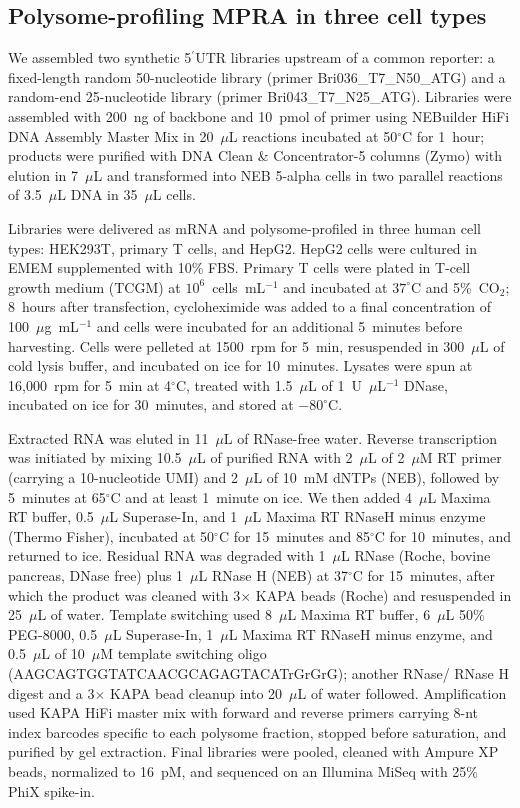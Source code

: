 \documentclass[11pt]{article}
\begin{document}
\subsection{Polysome-profiling MPRA in three cell types}

We assembled two synthetic 5$^\prime$UTR libraries upstream of a common
reporter: a fixed-length random 50-nucleotide library
(primer Bri036\_T7\_N50\_ATG) and a random-end 25-nucleotide library
(primer Bri043\_T7\_N25\_ATG). Libraries were assembled with 200~ng of
backbone and 10~pmol of primer using NEBuilder HiFi DNA Assembly
Master Mix in 20~$\mu$L reactions incubated at 50$^\circ$C for 1~hour;
products were purified with DNA Clean \& Concentrator-5 columns (Zymo)
with elution in 7~$\mu$L and transformed into NEB 5-alpha cells in two
parallel reactions of 3.5~$\mu$L DNA in 35~$\mu$L cells.

Libraries were delivered as mRNA and polysome-profiled in three human cell
types: HEK293T, primary T cells, and HepG2. HepG2 cells were cultured in
EMEM supplemented with 10\% FBS. Primary T cells were plated in T-cell
growth medium (TCGM) at $10^{6}$~cells~mL$^{-1}$ and incubated at
$37^\circ$C and 5\%~CO$_2$; 8~hours after transfection, cycloheximide was
added to a final concentration of 100~$\mu$g~mL$^{-1}$ and cells were
incubated for an additional 5~minutes before harvesting. Cells were
pelleted at 1500~rpm for 5~min, resuspended in 300~$\mu$L of cold lysis
buffer, and incubated on ice for 10~minutes. Lysates were spun at
16{,}000~rpm for 5~min at 4$^\circ$C, treated with 1.5~$\mu$L of
1~U~$\mu$L$^{-1}$ DNase, incubated on ice for 30~minutes, and stored at
$-80^\circ$C.

Extracted RNA was eluted in 11~$\mu$L of RNase-free water. Reverse
transcription was initiated by mixing 10.5~$\mu$L of purified RNA with
2~$\mu$L of 2~$\mu$M RT primer (carrying a 10-nucleotide UMI) and
2~$\mu$L of 10~mM dNTPs (NEB), followed by 5~minutes at 65$^\circ$C and
at least 1~minute on ice. We then added 4~$\mu$L Maxima RT buffer,
0.5~$\mu$L Superase-In, and 1~$\mu$L Maxima RT RNaseH minus enzyme
(Thermo Fisher), incubated at 50$^\circ$C for 15~minutes and
85$^\circ$C for 10~minutes, and returned to ice. Residual RNA was
degraded with 1~$\mu$L RNase (Roche, bovine pancreas, DNase free) plus
1~$\mu$L RNase H (NEB) at 37$^\circ$C for 15~minutes, after which the
product was cleaned with 3$\times$ KAPA beads (Roche) and resuspended
in 25~$\mu$L of water. Template switching used 8~$\mu$L Maxima RT
buffer, 6~$\mu$L 50\% PEG-8000, 0.5~$\mu$L Superase-In, 1~$\mu$L
Maxima RT RNaseH minus enzyme, and 0.5~$\mu$L of 10~$\mu$M template
switching oligo (AAGCAGTGGTATCAACGCAGAGTACATrGrGrG); another RNase/
RNase H digest and a 3$\times$ KAPA bead cleanup into 20~$\mu$L of
water followed. Amplification used KAPA HiFi master mix with forward
and reverse primers carrying 8-nt index barcodes specific to each
polysome fraction, stopped before saturation, and purified by gel
extraction. Final libraries were pooled, cleaned with Ampure XP beads,
normalized to 16~pM, and sequenced on an Illumina MiSeq with
25\% PhiX spike-in.
\end{document}
